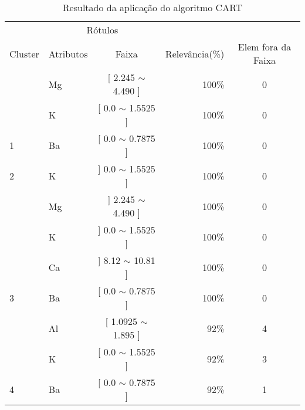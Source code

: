 \begin{table}[!h]
\centering
\caption{Resultado da aplicação do algoritmo CART}
\label{tab:rot:iris:cart}
\begin{tabular}{llcrc} \hline
 
\multicolumn{1}{c}{\cellcolor[HTML]{FFFFFF}} & \multicolumn{2}{c}{Rótulos}                & \multicolumn{1}{r}{}               & \\ \cline{2-3}
Cluster                                      & Atributos      & \multicolumn{1}{c}{Faixa} & \multicolumn{1}{c}{Relevância(\%)} & Elem fora da Faixa\\ \hline \hline
                                             & Mg    & [ 2.245 $\sim$  4.490     ]       & 100\%                               & 0 \\
                                             & K     & [ 0.0 $\sim$  1.5525      ]       & 100\%                               & 0 \\  
\multirow{-3}{*}{1}                          & Ba    & [ 0.0 $\sim$  0.7875     ]       & 100\%                               & 0 \\  \hline
2                                            & K     & ] 0.0 $\sim$  1.5525 ]           & 100\%                               & 0\\  \hline
                                            & Mg     & ]  2.245 $\sim$  4.490  ]              & 100\%                               & 0\\ 
                                            & K     & ] 0.0 $\sim$  1.5525 ]               & 100\%                               & 0\\  
                                            & Ca     & ] 8.12 $\sim$  10.81 ]       & 100\%                               & 0\\ 
\multirow{-3}{*}{3}                          & Ba    & [ 0.0 $\sim$  0.7875     ]       & 100\%                               & 0 \\  \hline
                                             & Al    & [ 1.0925 $\sim$  1.895 ]       & 92\%                               & 4 \\
                                             & K     & [ 0.0 $\sim$  1.5525      ]       & 92\%                               & 3 \\  
\multirow{-3}{*}{4}                          & Ba    & [ 0.0 $\sim$  0.7875     ]       & 92\%                               & 1 \\  \hline

\end{tabular}
\end{table}
